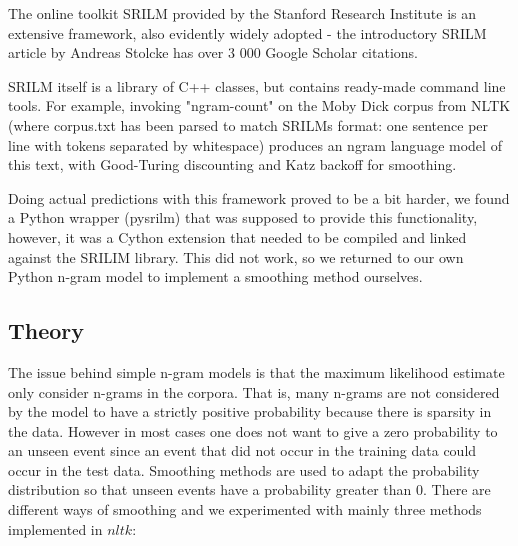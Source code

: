 \documentclass[a4paper,12pt]{article}
\begin{document}
The online toolkit SRILM provided by the Stanford Research Institute is an extensive framework, also evidently widely adopted - the introductory SRILM article by Andreas Stolcke has over 3 000 Google Scholar citations.

SRILM itself is a library of C++ classes, but contains ready-made command line tools. For example, invoking "ngram-count" on the Moby Dick corpus from NLTK (where corpus.txt has been parsed to match SRILMs format: one sentence per line with tokens separated by whitespace) produces an ngram language model of this text, with Good-Turing discounting and Katz backoff for smoothing.

Doing actual predictions with this framework proved to be a bit harder, we found a Python wrapper (pysrilm) that was supposed to provide this functionality, however, it was a Cython extension that needed to be compiled and linked against the SRILIM library. This did not work, so we returned to our own Python n-gram model to implement a smoothing method ourselves.

\label{sec:ngramsmoothing}

\subsection{Theory}
	The issue behind simple n-gram models is that the maximum likelihood estimate only consider n-grams in the corpora. That is, many n-grams are not considered by the model to have a strictly positive probability because there is sparsity in the data. However in most cases one does not want to give a zero probability to an unseen event since an event that did not occur in the training data could occur in the test data. Smoothing methods are used to adapt the probability distribution so that unseen events have a probability greater than 0. There are different ways of smoothing and we experimented with mainly three methods implemented in $nltk$:
	
\end{document}
